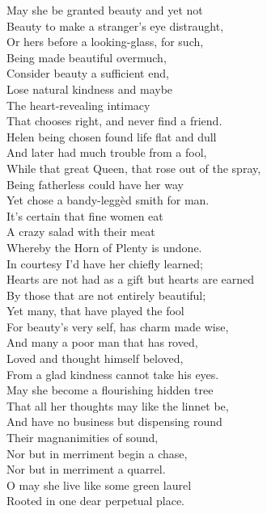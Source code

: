 \documentclass[a4,12pt]{article}
\begin{document}
\begin{center}
        \vspace{15pt}
        May she be granted beauty and yet not\\
        Beauty to make a stranger's eye distraught,\\
        Or hers before a looking-glass, for such,\\
        Being made beautiful overmuch,\\
        Consider beauty a sufficient end,\\
        Lose natural kindness and maybe\\
        The heart-revealing intimacy\\
        That chooses right, and never find a friend.\\

        \vspace{15pt}
        Helen being chosen found life flat and dull\\
        And later had much trouble from a fool,\\
        While that great Queen, that rose out of the spray,\\
        Being fatherless could have her way\\
        Yet chose a bandy-leggèd smith for man.\\
        It's certain that fine women eat\\
        A crazy salad with their meat\\
        Whereby the Horn of Plenty is undone.\\

        \vspace{15pt}
        In courtesy I'd have her chiefly learned;\\
        Hearts are not had as a gift but hearts are earned\\
        By those that are not entirely beautiful;\\
        Yet many, that have played the fool\\
        For beauty's very self, has charm made wise,\\
        And many a poor man that has roved,\\
        Loved and thought himself beloved,\\
        From a glad kindness cannot take his eyes.\\

        \vspace{15pt}
        May she become a flourishing hidden tree\\
        That all her thoughts may like the linnet be,\\
        And have no business but dispensing round\\
        Their magnanimities of sound,\\
        Nor but in merriment begin a chase,\\
        Nor but in merriment a quarrel.\\
        O may she live like some green laurel\\
        Rooted in one dear perpetual place.\\


\end{center}
\end{document}
